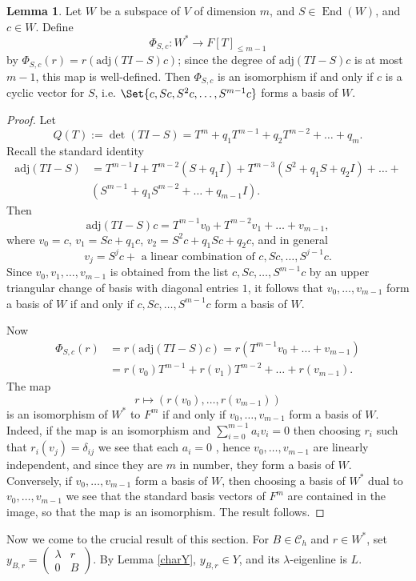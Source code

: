 \documentclass[preprint,11pt]{amsart}
\newcommand{\CalC}{\mathcal{C}}
\theoremstyle{definition}
\numberwithin{thm}{section}
\newtheorem{lem}[thm]{Lemma}
\newcommand{\End}{\operatorname{End}}
\newcommand{\trm}[1]{\textrm{#1}}
\newcommand{\lam}{\lambda}
\newcommand{\adj}{\textrm{adj}}
\begin{document}
\begin{lem}\label{cyclic_vector_lemma}
Let $W$ be a subspace of $V$ of dimension $m$, and $S \in \End(W)$, and $c \in W$. Define
$$
\Phi_{S,c} : W^* \to F[T]_{\leq m-1}
$$
by $\Phi_{S,c}(r) = r(\adj(TI-S)c)$; since the degree of $\adj(TI-S)c$ is at most $m-1$, this map is well-defined.
Then $\Phi_{S,c}$ is an isomorphism if and only if $c$ is a cyclic vector for $S$, i.e. $\Set{c, Sc, S^2 c, \ldots, S^{m-1}c}$ forms a basis of $W$.
\end{lem}
\begin{proof}
Let 
$$
Q(T) := \det(T I -S) = T^m +q_1 T^{m-1} + q_2 T^{m-2} + \ldots + q_m.
$$
Recall the standard identity 
\begin{align*}
\trm{adj}(TI-S) &= T^{m-1}I + T^{m-2}(S + q_1 I) + T^{m-3}(S^2 + q_1 S + q_2I) + \ldots + \\
& (S^{m-1} + q_1 S^{m-2} + \ldots + q_{m-1}I).
\end{align*}
Then 
$$
\trm{adj}(TI-S)c = T^{m-1}v_0 + T^{m-2}v_1 + \ldots + v_{m-1},
$$
where $v_0 = c$, $v_1 = Sc + q_1 c$, $v_2 = S^2 c + q_1 Sc + q_2 c$, and in general 
$$
v_j = S^j c + \trm{ a  linear combination of } c, Sc, \ldots, S^{j-1}c.
$$
Since $v_0, v_1,\ldots, v_{m-1}$ is obtained from the list $c, Sc, \ldots, S^{m-1}c$ by an upper triangular change of basis with diagonal entries $1$, it follows that $v_0, \ldots, v_{m-1}$ form a basis of $W$ if and only if $c, Sc, \ldots, S^{m-1}c$ form a basis of $W$.

Now 
\begin{align*}
\Phi_{S,c}(r) &= r ( \adj(TI-S)c ) = r \left( T^{m-1}v_0 + \ldots + v_{m-1} \right) \\
&= r(v_0) T^{m-1} + r(v_1) T^{m-2} + \ldots + r(v_{m-1}).
\end{align*}
The map 
$$
r \mapsto (r(v_0), \ldots, r(v_{m-1}))
$$
is an isomorphism of $W^*$ to $F^m$ if and only if $v_0, \ldots, v_{m-1}$ form a basis of $W$. Indeed, if the map is an isomorphism and $\sum_{i = 0}^{m-1} a_i v_i = 0$ then choosing $r_i$ such that $r_i(v_j) = \delta_{ij}$ we see that each $a_i = 0$ , hence $v_0, \ldots, v_{m-1}$ are linearly independent, and since they are $m$ in number, they form a basis of $W$. Conversely, if $v_0, \ldots, v_{m-1}$ form a basis of $W$, then choosing a basis of $W^*$ dual to $v_0, \ldots, v_{m-1}$ we see that the standard basis vectors of $F^m$ are contained in the image, so that the map is an isomorphism. The result follows.
\end{proof}
Now we come to the crucial result of this section. For $B \in \CalC_h$ and $r \in W^*$, set $y_{B,r} = \begin{pmatrix} \lam & r \\ 0 & B \end{pmatrix}$. By Lemma \ref{charY}, $y_{B,r} \in Y$, and its $\lam$-eigenline is $L$.
\end{document}
